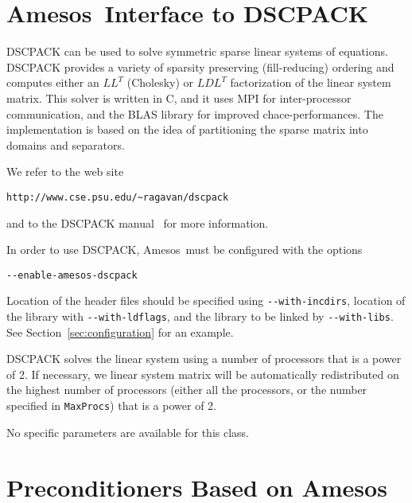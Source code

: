 \documentclass[11pt]{SANDreport}
\newcommand{\amesos}{{\sc Amesos}}
\begin{document}
\section{\amesos\ Interface to DSCPACK}
\label{sec:dscpack}

DSCPACK can be used to solve symmetric sparse linear systems of equations.
DSCPACK provides a variety of sparsity preserving (fill-reducing) ordering and
computes either an $LL^T$ (Cholesky) or $LDL^T$ factorization of the linear
system matrix. This solver is written in C, and it uses MPI for
inter-processor communication, and the BLAS library for improved
chace-performances. The implementation is based on the idea of partitioning
the sparse matrix into domains and separators. 

We refer to the web site
\begin{verbatim}
http://www.cse.psu.edu/~ragavan/dscpack
\end{verbatim}
and to the DSCPACK manual~\cite{dscpack-manual} for more
information.

\smallskip

In order to use DSCPACK, \amesos\ must be configured with the options
\begin{verbatim}
--enable-amesos-dscpack 
\end{verbatim}
Location of the header files should be specified using \verb!--with-incdirs!,
location of the library with \verb!--with-ldflags!, and the library
to be linked by \verb!--with-libs!. See Section~\ref{sec:configuration} for an
example.

\smallskip

DSCPACK solves the linear system using a number of processors that is a power
of 2. If necessary, we linear system matrix will be automatically
redistributed on the highest number of processors (either all the
processors, or the number specified in \verb!MaxProcs!) that is a power of 2.

\smallskip

No specific parameters are available for this class.

\section{Preconditioners Based on \amesos}
\label{sec:prec}
\end{document}
